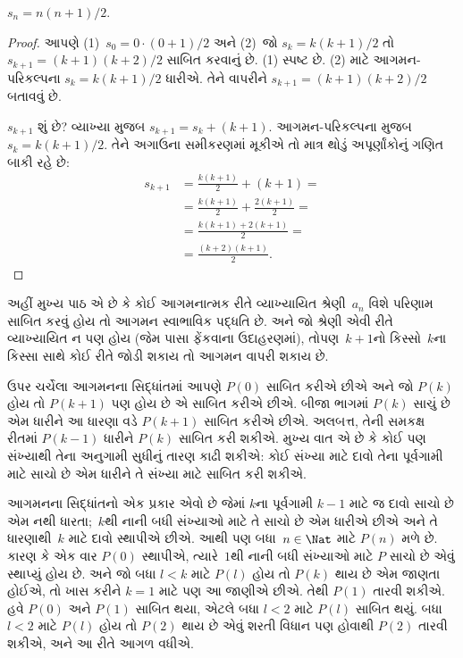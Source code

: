 \begin{prop}
  $s_n = n(n+1)/2$.
\end{prop}

\begin{proof}
  આપણે (1)~$s_0 = 0\cdot(0 + 1)/2$ અને (2)~જો $s_k =
  k(k+1)/2$ તો $s_{k+1} = (k+1)(k+2)/2$ સાબિત કરવાનું છે.
  (1) સ્પષ્ટ છે. (2) માટે આગમન-પરિકલ્પના $s_k = k(k+1)/2$
  ધારીએ. તેને વાપરીને $s_{k+1} = (k+1)(k+2)/2$ બતાવવું છે.

  $s_{k+1}$ શું છે? વ્યાખ્યા મુજબ $s_{k+1} = s_k + (k+1)$.
  આગમન-પરિકલ્પના મુજબ $s_k = k(k+1)/2$. તેને અગાઉના
  સમીકરણમાં મૂકીએ તો માત્ર થોડું અપૂર્ણાંકોનું ગણિત બાકી રહે છે:
  \begin{align*}
    s_{k+1} & = \frac{k(k+1)}{2} + (k+1) = {}\\
    & = \frac{k(k+1)}{2} + \frac{2(k+1)}{2} = {}\\
    & = \frac{k(k+1) + 2(k+1)}{2} = {}\\
    & = \frac{(k+2)(k+1)}{2}.
  \end{align*}
\end{proof}

અહીં મુખ્ય પાઠ એ છે કે કોઈ આગમનાત્મક રીતે વ્યાખ્યાયિત
શ્રેણી~$a_n$ વિશે પરિણામ સાબિત કરવું હોય તો આગમન
સ્વાભાવિક પદ્ધતિ છે. અને જો શ્રેણી એવી રીતે વ્યાખ્યાયિત
ન પણ હોય (જેમ પાસા ફેંકવાના ઉદાહરણમાં), તોપણ~$k+1$નો
કિસ્સો~$k$ના કિસ્સા સાથે કોઈ રીતે જોડી શકાય તો આગમન
વાપરી શકાય છે.
\endgroup


\begingroup
\makeatletter{}\makeatother


\label{guunit:OLP-0616}


ઉપર ચર્ચેલા આગમનના સિદ્ધાંતમાં આપણે $P(0)$ સાબિત કરીએ છીએ
અને જો $P(k)$ હોય તો $P(k+1)$ પણ હોય છે એ સાબિત કરીએ છીએ.
બીજા ભાગમાં $P(k)$ સાચું છે એમ ધારીને આ ધારણા વડે
$P(k+1)$ સાબિત કરીએ છીએ. અલબત્ત, તેની સમકક્ષ રીતમાં
$P(k-1)$ ધારીને $P(k)$ સાબિત કરી શકીએ. મુખ્ય વાત એ છે કે
કોઈ પણ સંખ્યાથી તેના અનુગામી સુધીનું તારણ કાઢી શકીએ:
કોઈ સંખ્યા માટે દાવો તેના પૂર્વગામી માટે સાચો છે એમ
ધારીને તે સંખ્યા માટે સાબિત કરી શકીએ.

આગમનના સિદ્ધાંતનો એક પ્રકાર એવો છે જેમાં $k$ના પૂર્વગામી
$k-1$ માટે જ દાવો સાચો છે એમ નથી ધારતા;~$k$થી નાની
બધી સંખ્યાઓ માટે તે સાચો છે એમ ધારીએ છીએ અને તે
ધારણાથી~$k$ માટે દાવો સ્થાપીએ છીએ. આથી પણ બધા~$n \in
\Nat$ માટે $P(n)$ મળે છે. કારણ કે એક વાર $P(0)$
સ્થાપીએ, ત્યારે~$1$થી નાની બધી સંખ્યાઓ માટે $P$ સાચો
છે એવું સ્થાપ્યું હોય છે. અને જો બધા $l<k$ માટે $P(l)$
હોય તો $P(k)$ થાય છે એમ જાણતા હોઈએ, તો ખાસ કરીને
$k=1$ માટે પણ આ જાણીએ છીએ. તેથી $P(1)$ તારવી
શકીએ. હવે $P(0)$ અને $P(1)$ સાબિત થયા, એટલે બધા
$l<2$ માટે $P(l)$ સાબિત થયું. બધા $l<2$ માટે $P(l)$
હોય તો $P(2)$ થાય છે એવું શરતી વિધાન પણ હોવાથી
$P(2)$ તારવી શકીએ, અને આ રીતે આગળ વધીએ.

